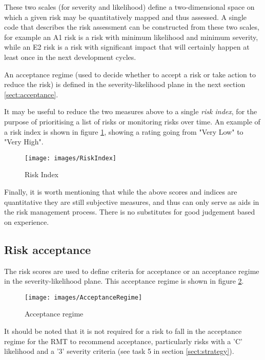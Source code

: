 These two scales (for severity and likelihood) define a two-dimensional space on which a given risk may be quantitatively mapped and thus assessed. A single code that describes the risk assessment can be constructed from these two scales, for example an A1 risk is a risk with minimum likelihood and minimum severity, while an E2 risk is a risk with significant impact that will certainly happen at least once in the next development cycles.

An acceptance regime (used to decide whether to accept a risk or take action to reduce the risk) is defined in the severity-likelihood plane in the next section \ref{sect:acceptance}.

It may be useful to reduce the two measures above to a single {\em risk index}, for the purpose of prioritising a list of risks or monitoring risks over time. An example of a risk index is shown in figure \ref{fig:riskindex}, showing a rating going from "Very Low" to "Very High".

  \begin{figure}[H]
  \begin{center}
  	\texttt{[image: images/RiskIndex]}
  \end{center}
\vspace{-2cm}
\caption{Risk Index \label{fig:riskindex}}
   \end{figure}

Finally, it is worth mentioning that while the above scores and indices are quantitative they are still subjective measures, and thus can only serve as aids in the risk management process. There is no substitutes for good judgement based on experience.

\subsection{Risk acceptance \label{sect:acceptance}}

The risk scores are used to define criteria for acceptance or an acceptance regime in the severity-likelihood plane. This acceptance regime is shown in figure \ref{fig:regime}.

  \begin{figure}[H]
  \begin{center}
  	\texttt{[image: images/AcceptanceRegime]}
  \end{center}
\vspace{-2cm}
\caption{Acceptance regime \label{fig:regime}}
   \end{figure}

It should be noted that it is not required for a risk to fall in the acceptance regime for the RMT to recommend acceptance, particularly risks with a 'C' likelihood and a '3' severity criteria (see task 5 in section \ref{sect:strategy}).
